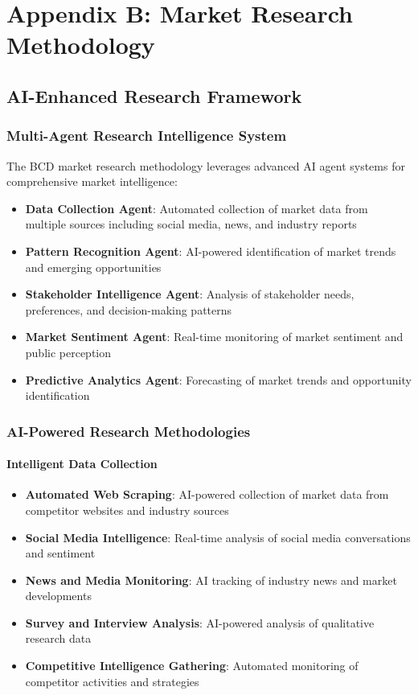 \documentclass[12pt,a4paper]{book}
\begin{document}
\chapter{Appendix B: Market Research Methodology}

\section{AI-Enhanced Research Framework}

\subsection{Multi-Agent Research Intelligence System}

The BCD market research methodology leverages advanced AI agent systems for comprehensive market intelligence:

\begin{itemize}
    \item \textbf{Data Collection Agent}: Automated collection of market data from multiple sources including social media, news, and industry reports
    \item \textbf{Pattern Recognition Agent}: AI-powered identification of market trends and emerging opportunities
    \item \textbf{Stakeholder Intelligence Agent}: Analysis of stakeholder needs, preferences, and decision-making patterns
    \item \textbf{Market Sentiment Agent}: Real-time monitoring of market sentiment and public perception
    \item \textbf{Predictive Analytics Agent}: Forecasting of market trends and opportunity identification
\end{itemize}

\subsection{AI-Powered Research Methodologies}

\subsubsection{Intelligent Data Collection}

\begin{itemize}
    \item \textbf{Automated Web Scraping}: AI-powered collection of market data from competitor websites and industry sources
    \item \textbf{Social Media Intelligence}: Real-time analysis of social media conversations and sentiment
    \item \textbf{News and Media Monitoring}: AI tracking of industry news and market developments
    \item \textbf{Survey and Interview Analysis}: AI-powered analysis of qualitative research data
    \item \textbf{Competitive Intelligence Gathering}: Automated monitoring of competitor activities and strategies
\end{itemize}
\end{document}
